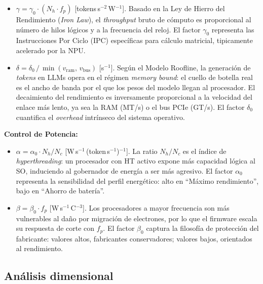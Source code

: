 \documentclass[10pt, twocolumn]{article}
\begin{document}
\begin{itemize}
  \item $\gamma = \gamma_0 \cdot (N_h \cdot f_p)$ [tokens\,s$^{-2}$\,W$^{-1}$].
        Basado en la Ley de Hierro del Rendimiento (\emph{Iron Law}), el
        \emph{throughput} bruto de cómputo es proporcional al número de hilos
        lógicos y a la frecuencia del reloj. El factor $\gamma_0$ representa las
        Instrucciones Por Ciclo (IPC) específicas para cálculo matricial,
        tipicamente acelerado por la NPU.

  \item $\delta = \delta_0 \,/\, \min(v_{\text{ram}},\, v_{\text{bus}})$
        [s$^{-1}$]. Según el Modelo Roofline, la generación de \emph{tokens} en
        LLMs opera en el régimen \emph{memory bound}: el cuello de botella real es
        el ancho de banda por el que los pesos del modelo llegan al procesador.
        El decaimiento del rendimiento es inversamente proporcional a la velocidad
        del enlace más lento, ya sea la RAM (MT/s) o el bus PCIe (GT/s). El factor
        $\delta_0$ cuantifica el \emph{overhead} intrínseco del sistema operativo.
\end{itemize}

\noindent\textbf{Control de Potencia:}

\begin{itemize}
  \item $\alpha = \alpha_0 \cdot N_h/N_c$
        [W\,s$^{-1}$\,(token\,s$^{-1}$)$^{-1}$]. La ratio $N_h/N_c$ es el
        índice de \emph{hyperthreading}: un procesador con HT activo expone más
        capacidad lógica al SO, induciendo al gobernador de energía a ser más
        agresivo. El factor $\alpha_0$ representa la sensibilidad del perfil
        energético: alto en ``Máximo rendimiento'', bajo en ``Ahorro de batería''.

  \item $\beta = \beta_0 \cdot f_p$
        [W\,s$^{-1}$\,\textdegree C$^{-3}$]. Los procesadores a mayor frecuencia
        son más vulnerables al daño por migración de electrones, por lo que el
        firmware escala su respuesta de corte con $f_p$. El factor $\beta_0$
        captura la filosofía de protección del fabricante: valores altos,
        fabricantes conservadores; valores bajos, orientados al rendimiento.
\end{itemize}

\subsection{Análisis dimensional}
\end{document}
